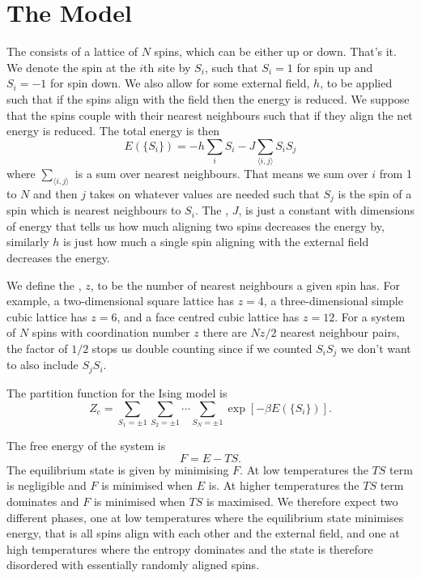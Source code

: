 \documentclass[fleqn]{NotesClass}
\newcommand*{\cpartition}{Z_{\mathrm{c}}}
\begin{document}
    \section{The Model}
    The  consists of a lattice of \(N\) spins, which can be either up or down.
    That's it.
    We denote the spin at the \(i\)th site by \(S_i\), such that \(S_i = 1\) for spin up and \(S_i = -1\) for spin down.
    We also allow for some external field, \(h\), to be applied such that if the spins align with the field then the energy is reduced.
    We suppose that the spins couple with their nearest neighbours such that if they align the net energy is reduced.
    The total energy is then
    \begin{equation}
        E(\{S_i\}) = -h\sum_{i}S_i - J\sum_{\langle i, j \rangle} S_i S_j
    \end{equation}
    where \(\sum_{\langle i, j \rangle}\) is a sum over nearest neighbours.
    That means we sum over \(i\) from 1 to \(N\) and then \(j\) takes on whatever values are needed such that \(S_j\) is the spin of a spin which is nearest neighbours to \(S_i\).
    The , \(J\), is just a constant with dimensions of energy that tells us how much aligning two spins decreases the energy by, similarly \(h\) is just how much a single spin aligning with the external field decreases the energy.
    
    We define the , \(z\), to be the number of nearest neighbours a given spin has.
    For example, a two-dimensional square lattice has \(z = 4\), a three-dimensional simple cubic lattice has \(z = 6\), and a face centred cubic lattice has \(z = 12\).
    For a system of \(N\) spins with coordination number \(z\) there are \(N z / 2\) nearest neighbour pairs, the factor of \(1/2\) stops us double counting since if we counted \(S_iS_j\) we don't want to also include \(S_jS_i\).
    
    The partition function for the Ising model is
    \begin{equation}
        \cpartition = \sum_{S_1 = \pm 1}\sum_{S_2 = \pm 1} \dotsb \sum_{S_N = \pm 1} \exp[-\beta E(\{S_i\})].
    \end{equation}
    
    The free energy of the system is
    \begin{equation}
        F = E - TS. 
    \end{equation}
    The equilibrium state is given by minimising \(F\).
    At low temperatures the \(TS\) term is negligible and \(F\) is minimised when \(E\) is.
    At higher temperatures the \(TS\) term dominates and \(F\) is minimised when \(TS\) is maximised.
    We therefore expect two different phases, one at low temperatures where the equilibrium state minimises energy, that is all spins align with each other and the external field, and one at high temperatures where the entropy dominates and the state is therefore disordered with essentially randomly aligned spins.
    
\end{document}
